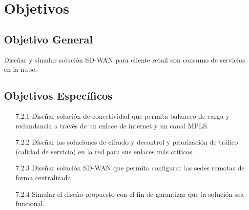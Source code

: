 \chapter{Objetivos}
\label{cha:Objetivos}

\section{Objetivo General} %
\label{sec:Objetivo General}


Diseñar y simular solución SD-WAN para cliente retail con consumo de servicios en
la nube.

\section{Objetivos Específicos} %
\label{sec:Objetivos Específicos}

\begin{itemize}
\item[7.2.1]Diseñar solución de conectividad que permita balanceo de carga y redundancia a través de un enlace de internet y un canal MPLS.
\item[7.2.2]Diseñar las soluciones de cifrado y decontrol y priorización de tráfico (calidad de servicio) en la red para sus enlaces más críticos.
\item[7.2.3]Diseñar solución SD-WAN que permita configurar las sedes remotas de forma centralizada.
\item[7.2.4]Simular el diseño propuesto con el fin de garantizar que la solución sea funcional.

\end{itemize}

